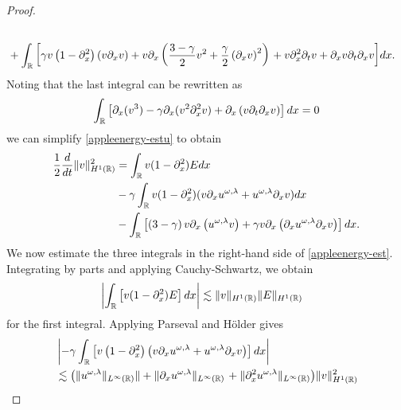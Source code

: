 \begin{proof}
\begin{equation}
\begin{split}
\\
&+  \int_{\mathbb{R}}
\left[ \gamma v \left( 1-\partial_x^2 \right)\left( v \partial_x v \right) + v
\partial_x \left( \frac{3-\gamma}{2} v^2 + \frac{\gamma}{2}\left( \partial_x v \right)^2
\right) \right . +  v \partial_x^2 \partial_t v + \partial_x v \partial_t \partial_x v\bigg]dx.
\end{split}
\end{equation}
Noting that the last integral can be rewritten as 
\begin{equation*}
\begin{split}
\int_{\mathbb{R}} \left[ \partial_x (v^3) - \gamma \partial_x (v^2 \partial_x^2 v) + \partial_x\left( v \partial_t
\partial_x v
\right) \right]dx  = 0
\end{split}
\end{equation*}
%
we can simplify \eqref{appleenergy-estu} to obtain
%
%
\begin{equation}
\label{appleenergy-est}
\begin{split}
\frac{1}{2} \frac{d}{dt} \|v\|_{H^1(\mathbb{R})}^2  
& = 
\int_{\mathbb{R}}  v(1-\partial_x^2)E dx\\
&-
\gamma \int_{\mathbb{R}} v(1-\partial_x^2)(v\partial_x u^{\omega,\lambda} + 
u^{\omega,\lambda} \partial_x v) dx
\\
&- \int_{\mathbb{R}}\left[ \left( 3-\gamma \right)v \partial_x\left( u^{\omega,\lambda}v 
\right) + \gamma v
\partial_x \left( \partial_x u^{\omega,\lambda} \partial_x v \right)\right]dx.
\end{split}
\end{equation}
%
%
We now estimate the three integrals in the right-hand side of 
\eqref{appleenergy-est}. Integrating by parts and applying Cauchy-Schwartz,  
we obtain
%
%
%
\begin{equation}
\begin{split}
\label{applefirst_piece}
& \left |\int_{\mathbb{R}} \left [v (1- \partial_x^2)E \right ] dx \right |
\lesssim
\|v\|_{H^1(\mathbb{R})} \|E\|_{H^1(\mathbb{R})}
\end{split}
\end{equation}
for the first integral. Applying Parseval and H\"older gives
%
%
\begin{equation}
\begin{split}
\label{applesecond-piece-final}
& \left | -\gamma \int_{\rr}
\left[ v\left( 1-\p_x^2 \right)\left( v \p_x u^{\omega,\lambda} + 
u^{\omega,\lambda} \p_x v
\right) \right] dx \right |
\\
& \lesssim \left( \|u^{\omega,\lambda}\|_{L^\infty(\rr)}\| + \|\p_x 
u^{\omega,\lambda}
\|_{L^\infty(\rr)} \right .  + \|\p_x^2 u^{\omega,\lambda} 
\|_{L^\infty(\rr)}
\big )\|v\|_{H^1(\rr)}^2
\end{split}

\end{equation}
\end{proof}
